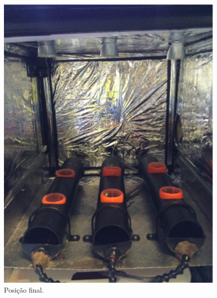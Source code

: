 \begin{figure}[!htb]
	\centering
	\includegraphics[width=14cm]{figuras/iluminaEstufa.png}
	\caption{Posição final.}
	\label{iluminaEstufa}
\end{figure}
